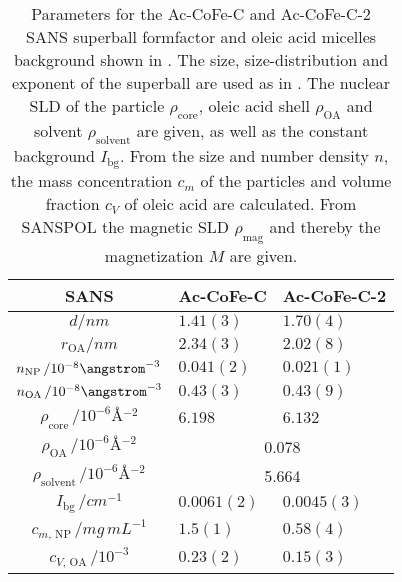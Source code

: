 \documentclass[\main/dresen_thesis.tex]{subfiles}
\begin{document}
    \begin{table}[!htbp]
      \centering
      \caption{\label{tab:monolayers:nanoparticle:sans:superballAcAcFit}Parameters for the Ac-CoFe-C and Ac-CoFe-C-2 SANS superball formfactor and oleic acid micelles background shown in .
      The size, size-distribution and exponent of the superball are used as in .
      The nuclear SLD of the particle $\rho_\mathrm{core}$, oleic acid shell $\rho_\mathrm{OA}$ and solvent $\rho_\mathrm{solvent}$ are given, as well as the constant background $I_\mathrm{bg}$. From the size and number density $n$, the mass concentration $c_m$ of the particles and volume fraction $c_V$ of oleic acid are calculated. From SANSPOL the magnetic SLD $\rho_\mathrm{mag}$ and thereby the magnetization $M$ are given.}
      \begin{tabular}{ c | l | l }
        \textbf{SANS}  & \textbf{Ac-CoFe-C} & \textbf{Ac-CoFe-C-2}\\
        \hline
        \rule{0pt}{2ex} $d / \unit{nm}$                                              & $1.41(3)$      & $1.70(4)$  \\
        \rule{0pt}{2ex} $r_\mathrm{OA} / \unit{nm}$                                  & $2.34(3)$      & $2.02(8)$  \\
        \rule{0pt}{2ex} $n_\mathrm{NP} \, / 10^{-8} \angstrom^{-3}$                  & $0.041(2)$     & $0.021(1)$ \\
        \rule{0pt}{2ex} $n_\mathrm{OA} \, / 10^{-8} \angstrom^{-3}$                  & $0.43(3)$      & $0.43(9)$  \\
        \hline
        \rule{0pt}{2ex} $\rho_\mathrm{core}    \, / \unit{10^{-6} \angstrom^{-2}}$   & $6.198$        & $6.132$    \\
        \hline
        \rule{0pt}{2ex} $\rho_\mathrm{OA}      \, / \unit{10^{-6} \angstrom^{-2}}$   & \multicolumn{2}{c}{0.078}\\
        \rule{0pt}{2ex} $\rho_\mathrm{solvent} \, / \unit{10^{-6} \angstrom^{-2}}$   & \multicolumn{2}{c}{5.664}\\
        \hline
        \rule{0pt}{2ex} $I_\mathrm{bg} \, / \unit{cm^{-1}}$                          & $0.0061(2)$    & $0.0045(3)$\\
        \hline
        \rule{0pt}{2ex} $c_{m, \, \mathrm{NP}} \, / \unit{mg\, mL^{-1}}$             & $1.5(1)$       & $0.58(4)$  \\
        \rule{0pt}{2ex} $c_{V, \, \mathrm{OA}} \, / \unit{10^{-3}}$                  & $0.23(2)$      & $0.15(3)$  \\

\end{tabular}
\end{table}
\end{document}
